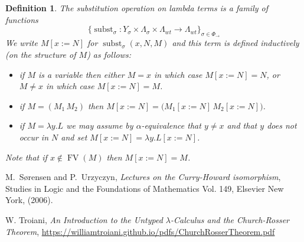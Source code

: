 \documentclass[english,letter paper,12pt,leqno]{article}
\theoremstyle{example}
\newtheorem{definition}[theorem]{Definition}
\numberwithin{equation}{section}
\begin{document}
\begin{definition}\label{defn:subst} The substitution operation on lambda terms is a family of functions
	\[
	\big\{ \operatorname{subst}_\sigma: Y_\sigma \times \Lambda_{\sigma} \times \Lambda_{wt} \longrightarrow \Lambda_{wt} \big\}_{\sigma \in \Phi_{\rightarrow}} \]
	We write $M[ x:= N ]$ for $\operatorname{subst}_\sigma( x, N, M )$ and this term is defined inductively (on the structure of $M$) as follows:
	\begin{itemize}
		\item if $M$ is a variable then either $M = x$ in which case $M[x := N] = N$, or $M \neq x$ in which case $M[ x:= N ] = M$.
		\item if $M = (M_1 \, M_2)$ then $M[x := N] = \big(M_1[x:= N] \, M_2[x := N]\big)$.
		\item if $M = \lambda y. L$ we may assume by $\alpha$-equivalence that $y \neq x$ and that $y$ does not occur in $N$ and set $M[x := N] = \lambda y. L[ x := N ]$. %
	\end{itemize}
	Note that if $x \notin \operatorname{FV}(M)$ then $M[ x:= N] = M$.
\end{definition}

\begin{thebibliography}{9}
	M.~S\o rensen and P.~Urzyczyn, \textsl{Lectures on the Curry-Howard isomorphism}, Studies in Logic and the Foundations of Mathematics Vol. 149, Elsevier New York, (2006).
	
	 W. Troiani, \textsl{An Introduction to the Untyped $\lambda$-Calculus and the Church-Rosser Theorem}, \url{https://williamtroiani.github.io/pdfs/ChurchRosserTheorem.pdf}
	
\end{thebibliography}
\end{document}
